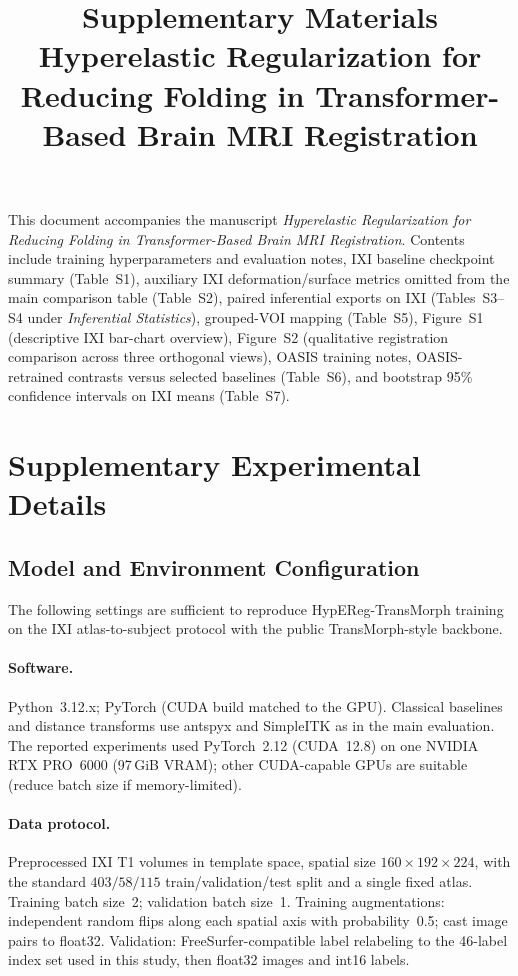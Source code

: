 \documentclass[11pt,a4paper]{article}
\title{Supplementary Materials\\Hyperelastic Regularization for Reducing Folding in Transformer-Based Brain MRI Registration}
\author{}
\date{}
\begin{document}
\maketitle

\noindent This document accompanies the manuscript \emph{Hyperelastic Regularization for Reducing Folding in Transformer-Based Brain MRI Registration}. Contents include training hyperparameters and evaluation notes, IXI baseline checkpoint summary (Table~S1), auxiliary IXI deformation/surface metrics omitted from the main comparison table (Table~S2), paired inferential exports on IXI (Tables~S3--S4 under \emph{Inferential Statistics}), grouped-VOI mapping (Table~S5), Figure~S1 (descriptive IXI bar-chart overview), Figure~S2 (qualitative registration comparison across three orthogonal views), OASIS training notes, OASIS-retrained contrasts versus selected baselines (Table~S6), and bootstrap 95\% confidence intervals on IXI means (Table~S7).

\section{Supplementary Experimental Details}
\subsection{Model and Environment Configuration}
The following settings are sufficient to reproduce HypEReg-TransMorph training on the IXI atlas-to-subject protocol with the public TransMorph-style backbone.

\paragraph{Software.}
Python~3.12.x; PyTorch (CUDA build matched to the GPU). Classical baselines and distance transforms use antspyx and SimpleITK as in the main evaluation. The reported experiments used PyTorch~2.12 (CUDA~12.8) on one NVIDIA RTX PRO~6000 (97\,GiB VRAM); other CUDA-capable GPUs are suitable (reduce batch size if memory-limited).

\paragraph{Data protocol.}
Preprocessed IXI T1 volumes in template space, spatial size \(160\times192\times224\), with the standard \(403/58/115\) train/validation/test split and a single fixed atlas. Training batch size~2; validation batch size~1. Training augmentations: independent random flips along each spatial axis with probability~0.5; cast image pairs to float32. Validation: FreeSurfer-compatible label relabeling to the 46-label index set used in this study, then float32 images and int16 labels.
\end{document}
